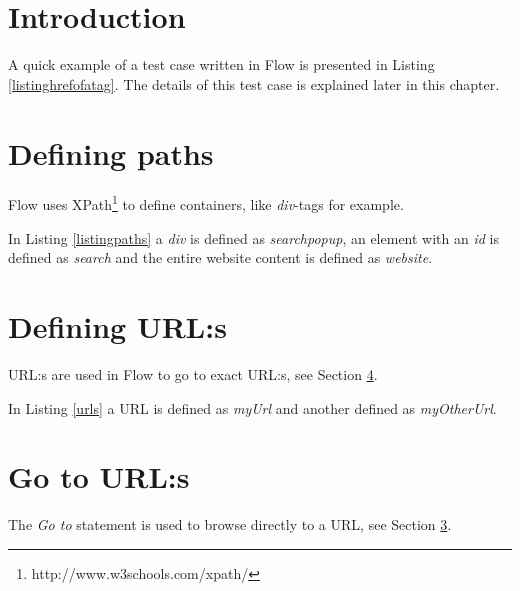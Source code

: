 \documentclass[a4paper,11pt]{kth-mag}
\begin{document}
\section{Introduction}
\label{flowintro}
A quick example of a test case written in Flow is presented in Listing \ref{listinghrefofatag}. The details of this test case is explained later in this chapter.

\lstset{basicstyle=\footnotesize, caption=Find href of an a tag, label=listinghrefofatag, numbers=left, frame=single, captionpos=b}


\section{Defining paths}
Flow uses XPath\footnote{http://www.w3schools.com/xpath/} to define containers, like \textit{div}-tags for example.

\lstset{basicstyle=\footnotesize, caption=Defining XPaths, label=listingpaths, numbers=left, frame=single, captionpos=b}


In Listing \ref{listingpaths} a \textit{div} is defined as \textit{searchpopup}, an element with an \textit{id} is defined as \textit{search} and the entire website content is defined as \textit{website}.

\section{Defining URL:s}
\label{flowurls}
URL:s are used in Flow to go to exact URL:s, see Section \ref{flowgoto}.

\lstset{basicstyle=\footnotesize, caption=Defining URLs, label=urls, numbers=left, frame=single, captionpos=b}


In Listing \ref{urls} a URL is defined as \textit{myUrl} and another defined as \textit{myOtherUrl}.

\section{Go to URL:s}
\label{flowgoto}
The \textit{Go to} statement is used to browse directly to a URL, see Section \ref{flowurls}.

\lstset{basicstyle=\footnotesize, caption=Go to statement, label=gotosimple, numbers=left, frame=single, captionpos=b}

\end{document}
